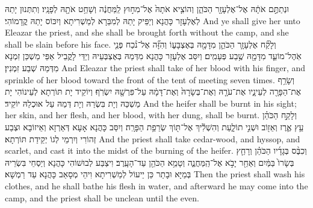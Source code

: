 {וּנְתַתֶּ֣ם אֹתָ֔הּ אֶל־אֶלְעָזָ֖ר הַכֹּהֵ֑ן וְהוֹצִ֤יא אֹתָהּ֙ אֶל־מִח֣וּץ לַֽמַּחֲנֶ֔ה וְשָׁחַ֥ט אֹתָ֖הּ לְפָנָֽיו׃
}
{וְתִתְּנוּן יָתַהּ לְאֶלְעָזָר כָּהֲנָא וְיַפֵּיק יָתַהּ לְמִבַּרָא לְמַשְׁרִיתָא וְיִכּוֹס יָתַהּ קֳדָמוֹהִי׃}
{And ye shall give her unto Eleazar the priest, and she shall be brought forth without the camp, and she shall be slain before his face.}{}
{וְלָקַ֞ח אֶלְעָזָ֧ר הַכֹּהֵ֛ן מִדָּמָ֖הּ בְּאֶצְבָּע֑וֹ וְהִזָּ֞ה אֶל־נֹ֨כַח פְּנֵ֧י אֹֽהֶל־מוֹעֵ֛ד מִדָּמָ֖הּ שֶׁ֥בַע פְּעָמִֽים׃
}
{וְיִסַּב אֶלְעָזָר כָּהֲנָא מִדְּמַהּ בְּאֶצְבְּעֵיהּ וְיַדֵּי לָקֳבֵיל אַפֵּי מַשְׁכַּן זִמְנָא מִדְּמַהּ שְׁבַע זִמְנִין׃}
{And Eleazar the priest shall take of her blood with his finger, and sprinkle of her blood toward the front of the tent of meeting seven times.}{}
{וְשָׂרַ֥ף אֶת־הַפָּרָ֖ה לְעֵינָ֑יו אֶת־עֹרָ֤הּ וְאֶת־בְּשָׂרָהּ֙ וְאֶת־דָּמָ֔הּ עַל־פִּרְשָׁ֖הּ יִשְׂרֹֽף׃}
{וְיוֹקֵיד יָת תּוֹרְתָא לְעֵינוֹהִי יָת מַשְׁכַּהּ וְיָת בִּשְׂרַהּ וְיָת דְּמַהּ עַל אוּכְלַהּ יוֹקֵיד׃}
{And the heifer shall be burnt in his sight; her skin, and her flesh, and her blood, with her dung, shall be burnt.}{}
{וְלָקַ֣ח הַכֹּהֵ֗ן עֵ֥ץ אֶ֛רֶז וְאֵז֖וֹב וּשְׁנִ֣י תוֹלָ֑עַת וְהִשְׁלִ֕יךְ אֶל־תּ֖וֹךְ שְׂרֵפַ֥ת הַפָּרָֽה׃}
{וְיִסַּב כָּהֲנָא אָעָא דְּאַרְזָא וְאֵיזוֹבָא וּצְבַע זְהוֹרִי וְיִרְמֵי לְגוֹ יְקֵידַת תּוֹרְתָא׃}
{And the priest shall take cedar-wood, and hyssop, and scarlet, and cast it into the midst of the burning of the heifer.}{}
{וְכִבֶּ֨ס בְּגָדָ֜יו הַכֹּהֵ֗ן וְרָחַ֤ץ בְּשָׂרוֹ֙ בַּמַּ֔יִם וְאַחַ֖ר יָבֹ֣א אֶל־הַֽמַּחֲנֶ֑ה וְטָמֵ֥א הַכֹּהֵ֖ן עַד־הָעָֽרֶב׃
}
{וִיצַבַּע לְבוּשׁוֹהִי כָּהֲנָא וְיַסְחֵי בִּשְׂרֵיהּ בְּמַיָּא וּבָתַר כֵּן יֵיעוֹל לְמַשְׁרִיתָא וִיהֵי מְסָאַב כָּהֲנָא עַד רַמְשָׁא׃}
{Then the priest shall wash his clothes, and he shall bathe his flesh in water, and afterward he may come into the camp, and the priest shall be unclean until the even.}{}
